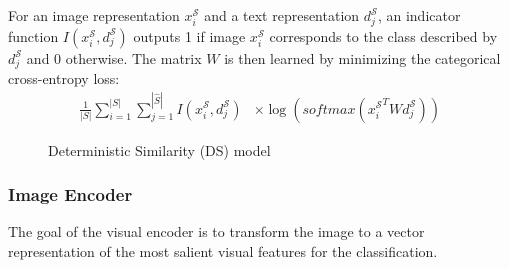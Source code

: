\documentclass[11pt,a4paper]{article}
\newcommand\gal[1]{\textcolor{bright}{\textbf{GAL:} #1 }}
\begin{document}
For an image representation $x^{\mathcal{S}}_i$ and a text representation $d^{\mathcal{S}}_j$, an indicator function $I(x^{\mathcal{S}}_i,d^{\mathcal{S}}_j)$  outputs 1 if image $x^{\mathcal{S}}_i$ corresponds to the class described by $d^{\mathcal{S}}_j$ and 0 otherwise. 
The matrix $W$ is then learned by minimizing the categorical cross-entropy loss: 
\begin{equation}
\begin{split}
    \frac{1}{|S|}\sum_{i=1}^{|S|}\sum_{j=1}^{|\hat{S}|}I(x^{\mathcal{S}}_i,d^{\mathcal{S}}_j) 
    &\times\log(\textit{softmax}({x^{\mathcal{S}}_i}^TWd^{\mathcal{S}}_j))
\end{split}
\end{equation}






\begin{figure}[t]
\centering
{}
 \caption{Deterministic Similarity (DS) model}
\label{fig:DS}
\end{figure}

\subsubsection{Image Encoder}
\label{section:Image_Encoder}
The goal of the visual encoder is to transform the image to a vector representation of the most salient visual features for the classification. 
\end{document}
